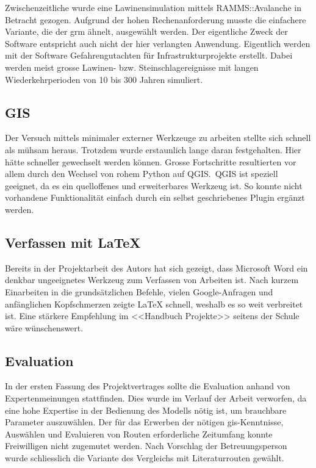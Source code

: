 Zwischenzeitliche wurde eine Lawinensimulation mittels RAMMS::Avalanche in Betracht gezogen. Aufgrund der hohen Rechenanforderung musste die einfachere Variante, die der \gls{grm} ähnelt, ausgewählt werden. Der eigentliche Zweck der Software entspricht auch nicht der hier verlangten Anwendung. Eigentlich werden mit der Software Gefahrengutachten für Infrastrukturprojekte erstellt. Dabei werden meist grosse Lawinen- bzw. Steinschlagereignisse mit langen Wiederkehrperioden von 10 bis 300 Jahren simuliert.

\subsection{GIS}

Der Versuch mittels minimaler externer Werkzeuge zu arbeiten stellte sich schnell als mühsam heraus. Trotzdem wurde erstaunlich lange daran festgehalten. Hier hätte schneller gewechselt werden können. 
Grosse Fortschritte resultierten vor allem durch den Wechsel von rohem Python auf QGIS.\ QGIS ist speziell geeignet, da es ein quelloffenes und erweiterbares Werkzeug ist. So konnte nicht vorhandene Funktionalität einfach durch ein selbst geschriebenes Plugin ergänzt werden.
\pagebreak
\subsection{Verfassen mit LaTeX}
Bereits in der Projektarbeit des Autors hat sich gezeigt, dass Microsoft Word ein denkbar ungeeignetes Werkzeug zum Verfassen von Arbeiten ist. Nach kurzem Einarbeiten in die grundsätzlichen Befehle, vielen Google-Anfragen und anfänglichen Kopfschmerzen zeigte LaTeX schnell, weshalb es so weit verbreitet ist. Eine stärkere Empfehlung im <<Handbuch Projekte>> seitens der Schule wäre wünschenswert.

\subsection{Evaluation}

In der ersten Fassung des Projektvertrages sollte die Evaluation anhand von Expertenmeinungen stattfinden. Dies wurde im  Verlauf der Arbeit verworfen, da eine hohe Expertise in der Bedienung des Modells nötig ist, um brauchbare Parameter auszuwählen. Der für das Erwerben der nötigen \gls{gis}-Kenntnisse, Auswählen und Evaluieren von Routen erforderliche Zeitumfang konnte Freiwilligen nicht zugemutet werden. Nach Vorschlag der Betreuungsperson wurde schliesslich die Variante des Vergleichs mit Literaturrouten gewählt.

